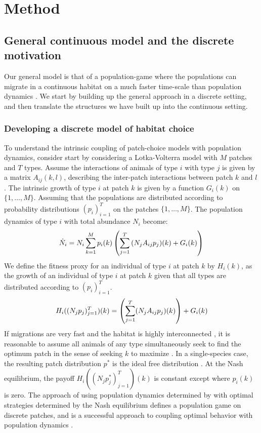 \section{Method}

\subsection{General continuous model and the discrete motivation}
\label{sec:gen_model}

Our general model is that of a population-game \citep{kvrivan2009evolutionary} where the populations can migrate in a continuous habitat on a much faster time-scale than population dynamics \citep{cressman2006migration}. We start by building up the general approach in a discrete setting, and then translate the structures we have built up into the continuous setting.

\subsubsection{Developing a discrete model of habitat choice}
To understand the intrinsic coupling of patch-choice models with population dynamics, consider start by considering a Lotka-Volterra model with $M$ patches and $T$ types. Assume the interactions of animals of type $i$ with type $j$ is given by a matrix $A_{ij}(k,l)$, describing the inter-patch interactions between patch $k$ and $l$. The intrinsic growth of type $i$ at patch $k$ is given by a function $G_{i}(k)$ on $\{1,\dots,M\}$. Assuming that the populations are distributed according to probability distributions $(p_i)_{i=1}^T$ on the patches $\{1,\ldots,M\}$. The population dynamics of type $i$ with total abundance $N_i$ become:
  \begin{equation}
  \dot{N}_i = N_i \sum_{k=1}^M p_i(k) \left ( \sum_{j=1}^T {(N_j A_{ij} p_j)}(k) + G_i(k) \right )
  \label{eq:pop_dyn_lv}
\end{equation}
We define the fitness proxy for an individual of type $i$ at patch $k$ by $H_i(k)$, as the growth of an individual of type $i$ at patch $k$ given that all types are distributed according to $(p_i)_{i=1}^T$.
\begin{equation}
  H_i((N_j p_j)_{j=1}^T)(k) = \pa{\sum_{j=1}^T (N_j A_{ij}p_j)(k)} + G_i(k)%
  \label{eq:utility_pm}
\end{equation}
If migrations are very fast and the habitat is highly interconnected \citep{cressman2006migration, abrams2007role}, it is reasonable to assume all animals of any type simultaneously seek to find the optimum patch in the sense of seeking $k$ to maximize . In a single-species case, the resulting patch distribution $p^*$ is the ideal free distribution \citep{fretwell1969territorial}. At the Nash equilibrium, the payoff $H_i((N_j p_j^*)_{j=1}^T)(k)$ is constant except where $p_i(k)$ is zero. The approach of using population dynamics determined by  with optimal strategies determined by the Nash equilibrium defines a population game on discrete patches, and is a successful approach to coupling optimal behavior with population dynamics \citep{valdovinos2010consequences, mougi2019adaptive, pinti2021co}.


